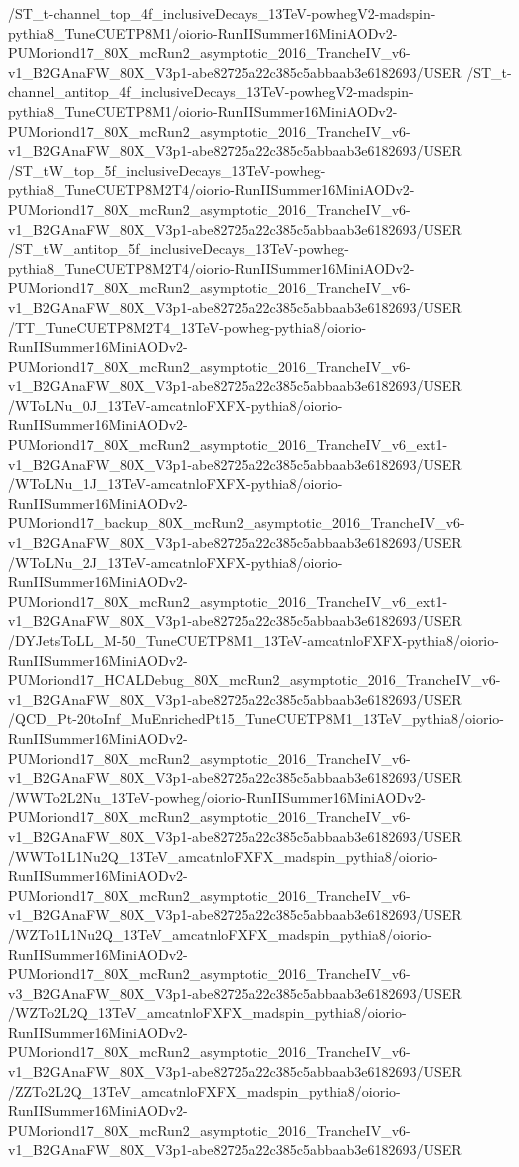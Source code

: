 /ST_t-channel_top_4f_inclusiveDecays_13TeV-powhegV2-madspin-pythia8_TuneCUETP8M1/oiorio-RunIISummer16MiniAODv2-PUMoriond17_80X_mcRun2_asymptotic_2016_TrancheIV_v6-v1_B2GAnaFW_80X_V3p1-abe82725a22c385c5abbaab3e6182693/USER
/ST_t-channel_antitop_4f_inclusiveDecays_13TeV-powhegV2-madspin-pythia8_TuneCUETP8M1/oiorio-RunIISummer16MiniAODv2-PUMoriond17_80X_mcRun2_asymptotic_2016_TrancheIV_v6-v1_B2GAnaFW_80X_V3p1-abe82725a22c385c5abbaab3e6182693/USER
/ST_tW_top_5f_inclusiveDecays_13TeV-powheg-pythia8_TuneCUETP8M2T4/oiorio-RunIISummer16MiniAODv2-PUMoriond17_80X_mcRun2_asymptotic_2016_TrancheIV_v6-v1_B2GAnaFW_80X_V3p1-abe82725a22c385c5abbaab3e6182693/USER
/ST_tW_antitop_5f_inclusiveDecays_13TeV-powheg-pythia8_TuneCUETP8M2T4/oiorio-RunIISummer16MiniAODv2-PUMoriond17_80X_mcRun2_asymptotic_2016_TrancheIV_v6-v1_B2GAnaFW_80X_V3p1-abe82725a22c385c5abbaab3e6182693/USER
/TT_TuneCUETP8M2T4_13TeV-powheg-pythia8/oiorio-RunIISummer16MiniAODv2-PUMoriond17_80X_mcRun2_asymptotic_2016_TrancheIV_v6-v1_B2GAnaFW_80X_V3p1-abe82725a22c385c5abbaab3e6182693/USER
/WToLNu_0J_13TeV-amcatnloFXFX-pythia8/oiorio-RunIISummer16MiniAODv2-PUMoriond17_80X_mcRun2_asymptotic_2016_TrancheIV_v6_ext1-v1_B2GAnaFW_80X_V3p1-abe82725a22c385c5abbaab3e6182693/USER
/WToLNu_1J_13TeV-amcatnloFXFX-pythia8/oiorio-RunIISummer16MiniAODv2-PUMoriond17_backup_80X_mcRun2_asymptotic_2016_TrancheIV_v6-v1_B2GAnaFW_80X_V3p1-abe82725a22c385c5abbaab3e6182693/USER
/WToLNu_2J_13TeV-amcatnloFXFX-pythia8/oiorio-RunIISummer16MiniAODv2-PUMoriond17_80X_mcRun2_asymptotic_2016_TrancheIV_v6_ext1-v1_B2GAnaFW_80X_V3p1-abe82725a22c385c5abbaab3e6182693/USER
/DYJetsToLL_M-50_TuneCUETP8M1_13TeV-amcatnloFXFX-pythia8/oiorio-RunIISummer16MiniAODv2-PUMoriond17_HCALDebug_80X_mcRun2_asymptotic_2016_TrancheIV_v6-v1_B2GAnaFW_80X_V3p1-abe82725a22c385c5abbaab3e6182693/USER
/QCD_Pt-20toInf_MuEnrichedPt15_TuneCUETP8M1_13TeV_pythia8/oiorio-RunIISummer16MiniAODv2-PUMoriond17_80X_mcRun2_asymptotic_2016_TrancheIV_v6-v1_B2GAnaFW_80X_V3p1-abe82725a22c385c5abbaab3e6182693/USER
/WWTo2L2Nu_13TeV-powheg/oiorio-RunIISummer16MiniAODv2-PUMoriond17_80X_mcRun2_asymptotic_2016_TrancheIV_v6-v1_B2GAnaFW_80X_V3p1-abe82725a22c385c5abbaab3e6182693/USER
/WWTo1L1Nu2Q_13TeV_amcatnloFXFX_madspin_pythia8/oiorio-RunIISummer16MiniAODv2-PUMoriond17_80X_mcRun2_asymptotic_2016_TrancheIV_v6-v1_B2GAnaFW_80X_V3p1-abe82725a22c385c5abbaab3e6182693/USER
/WZTo1L1Nu2Q_13TeV_amcatnloFXFX_madspin_pythia8/oiorio-RunIISummer16MiniAODv2-PUMoriond17_80X_mcRun2_asymptotic_2016_TrancheIV_v6-v3_B2GAnaFW_80X_V3p1-abe82725a22c385c5abbaab3e6182693/USER
/WZTo2L2Q_13TeV_amcatnloFXFX_madspin_pythia8/oiorio-RunIISummer16MiniAODv2-PUMoriond17_80X_mcRun2_asymptotic_2016_TrancheIV_v6-v1_B2GAnaFW_80X_V3p1-abe82725a22c385c5abbaab3e6182693/USER
/ZZTo2L2Q_13TeV_amcatnloFXFX_madspin_pythia8/oiorio-RunIISummer16MiniAODv2-PUMoriond17_80X_mcRun2_asymptotic_2016_TrancheIV_v6-v1_B2GAnaFW_80X_V3p1-abe82725a22c385c5abbaab3e6182693/USER
